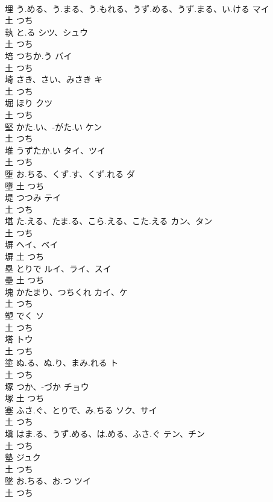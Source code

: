 \documentclass[8pt]{extreport}
\begin{document}
\begin{CJK}{UTF8}{min}
\\	埋	う.める、う.まる、う.もれる、うず.める、うず.まる、い.ける	マイ	
\\	土		つち		
\\	執	と.る	シツ、シュウ	
\\	土		つち		
\\	培	つちか.う	バイ	
\\	土		つち		
\\	埼	さき、さい、みさき	キ	
\\	土		つち		
\\	堀	ほり	クツ	
\\	土		つち		
\\	堅	かた.い、-がた.い	ケン	
\\	土		つち		
\\	堆	うずたか.い	タイ、ツイ	
\\	土		つち		
\\	堕	お.ちる、くず.す、くず.れる	ダ	
\\	墮	土		つち		
\\	堤	つつみ	テイ	
\\	土		つち		
\\	堪	た.える、たま.る、こら.える、こた.える	カン、タン	
\\	土		つち		
\\	塀		ヘイ、ベイ	
\\	塀	土		つち		
\\	塁	とりで	ルイ、ライ、スイ	
\\	壘	土		つち		
\\	塊	かたまり、つちくれ	カイ、ケ	
\\	土		つち		
\\	塑	でく	ソ	
\\	土		つち		
\\	塔		トウ	
\\	土		つち		
\\	塗	ぬ.る、ぬ.り、まみ.れる	ト	
\\	土		つち		
\\	塚	つか、-づか	チョウ	
\\	塚	土		つち		
\\	塞	ふさ.ぐ、とりで、み.ちる	ソク、サイ	
\\	土		つち		
\\	塡	はま.る、うず.める、は.める、ふさ.ぐ	テン、チン	
\\	土		つち		
\\	塾		ジュク	
\\	土		つち		
\\	墜	お.ちる、お.つ	ツイ	
\\	土		つち		

\end{CJK}
\end{document}
